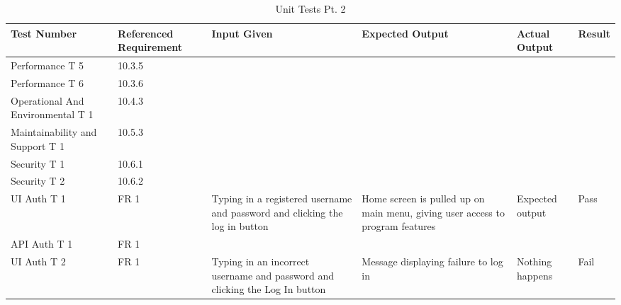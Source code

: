 \documentclass[12pt, titlepage]{article}
\begin{document}
\begin{table}[!h]
\caption{Unit Tests Pt. 2}
\begin{adjustwidth}{-2cm}{-2cm}
\begin{tabularx}{500pt}{|K|K|K|K|K|K|}
	\hline 
	\textbf{Test Number} & \textbf{Referenced Requirement} & \textbf{Input Given} & \textbf{Expected Output} & \textbf{Actual Output} & \textbf{Result} \\
	\hline 
	Performance T 5 & 10.3.5 &  &  &  &  \\
	\hline 
	Performance T 6 & 10.3.6 &  &  &  &  \\
	\hline 
	Operational And Environmental T 1 & 10.4.3 &  &  &  &  \\
	\hline 
	Maintainability and Support T 1 & 10.5.3 &  &  &  &  \\
	\hline 
	Security T 1 & 10.6.1 &  &  &  &  \\
	\hline 
	Security T 2 & 10.6.2 &  &  &  &  \\
	\hline
	 UI Auth T 1 & FR 1 & Typing in a registered username and password and clicking the log in button & Home screen is pulled up on main menu, giving user access to program features & Expected output & Pass \\
	\hline 
	API Auth T 1 & FR 1 &  &  &  &  \\
	\hline 
	UI Auth T 2 & FR 1 & Typing in an incorrect username and password and clicking the Log In button & Message displaying failure to log in & Nothing happens & Fail \\
	\hline
\end{tabularx}
\end{adjustwidth}	
\end{table}
\end{document}
